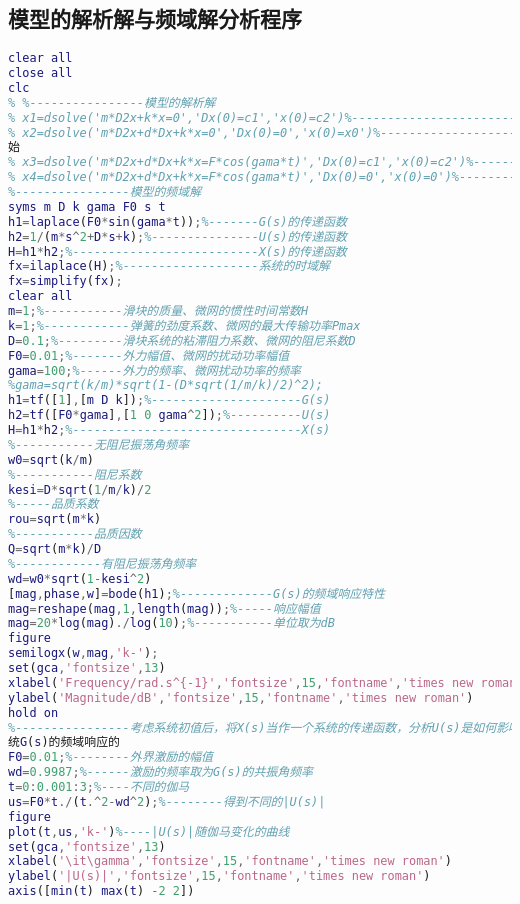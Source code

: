\documentclass[withoutpreface,bwprint]{cumcmthesis} %
\begin{document}
\newpage


\begin{appendices}


\section{模型的解析解与频域解分析程序}

\begin{lstlisting}[language=matlab]
clear all
close all
clc
% %----------------模型的解析解
% x1=dsolve('m*D2x+k*x=0','Dx(0)=c1','x(0)=c2')%-----------------------最简单的情况
% x2=dsolve('m*D2x+d*Dx+k*x=0','Dx(0)=0','x(0)=x0')%------------------- 不计阻尼、激励和初
始
% x3=dsolve('m*D2x+d*Dx+k*x=F*cos(gama*t)','Dx(0)=c1','x(0)=c2')%------最完整的情况
% x4=dsolve('m*D2x+d*Dx+k*x=F*cos(gama*t)','Dx(0)=0','x(0)=0')%--------不计初值的情况
%----------------模型的频域解
syms m D k gama F0 s t
h1=laplace(F0*sin(gama*t));%-------G(s)的传递函数
h2=1/(m*s^2+D*s+k);%---------------U(s)的传递函数
H=h1*h2;%--------------------------X(s)的传递函数
fx=ilaplace(H);%-------------------系统的时域解
fx=simplify(fx);
clear all
m=1;%-----------滑块的质量、微网的惯性时间常数H
k=1;%------------弹簧的劲度系数、微网的最大传输功率Pmax
D=0.1;%---------滑块系统的粘滞阻力系数、微网的阻尼系数D
F0=0.01;%-------外力幅值、微网的扰动功率幅值
gama=100;%------外力的频率、微网扰动功率的频率
%gama=sqrt(k/m)*sqrt(1-(D*sqrt(1/m/k)/2)^2);
h1=tf([1],[m D k]);%---------------------G(s)
h2=tf([F0*gama],[1 0 gama^2]);%----------U(s)
H=h1*h2;%--------------------------------X(s)
%-----------无阻尼振荡角频率
w0=sqrt(k/m)
%-----------阻尼系数
kesi=D*sqrt(1/m/k)/2
%-----品质系数
rou=sqrt(m*k)
%-----------品质因数
Q=sqrt(m*k)/D
%------------有阻尼振荡角频率
wd=w0*sqrt(1-kesi^2)
[mag,phase,w]=bode(h1);%-------------G(s)的频域响应特性
mag=reshape(mag,1,length(mag));%-----响应幅值
mag=20*log(mag)./log(10);%-----------单位取为dB
figure
semilogx(w,mag,'k-');
set(gca,'fontsize',13)
xlabel('Frequency/rad.s^{-1}','fontsize',15,'fontname','times new roman')
ylabel('Magnitude/dB','fontsize',15,'fontname','times new roman')
hold on
%----------------考虑系统初值后，将X(s)当作一个系统的传递函数，分析U(s)是如何影响系
统G(s)的频域响应的
F0=0.01;%--------外界激励的幅值
wd=0.9987;%------激励的频率取为G(s)的共振角频率
t=0:0.001:3;%----不同的伽马
us=F0*t./(t.^2-wd^2);%--------得到不同的|U(s)|
figure
plot(t,us,'k-')%----|U(s)|随伽马变化的曲线
set(gca,'fontsize',13)
xlabel('\it\gamma','fontsize',15,'fontname','times new roman')
ylabel('|U(s)|','fontsize',15,'fontname','times new roman')
axis([min(t) max(t) -2 2])

\end{lstlisting}
\end{appendices}
\end{document}
